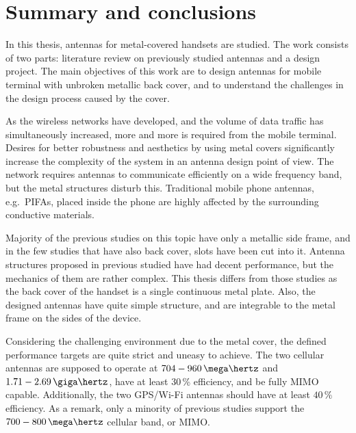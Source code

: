 \section{Summary and conclusions} 
\label{sec:conclusions}

\begin{comment}
\begin{itemize}
\item[--]yhteenveto mitä tehty
\item[--]päätulokset
\item[--]johtopäätökset
\item[--]oma arvio?
\end{itemize}
\end{comment}

In this thesis, antennas for metal-covered handsets are studied. The work consists of two parts: literature review on previously studied antennas and a design project. The main objectives of this work are to design antennas for mobile terminal with unbroken metallic back cover, and to understand the challenges in the design process caused by the cover.

As the wireless networks have developed, and the volume of data traffic has simultaneously increased, more and more is required from the mobile terminal. Desires for better robustness and aesthetics by using metal covers significantly increase the complexity of the system in an antenna design point of view. The network requires antennas to communicate efficiently on a wide frequency band, but the metal structures disturb this. Traditional mobile phone antennas, e.g.\ PIFAs, placed inside the phone are highly affected by the surrounding conductive materials.

Majority of the previous studies on this topic have only a metallic side frame, and in the few studies that have also back cover, slots have been cut into it. Antenna structures proposed in previous studied have had decent performance, but the mechanics of them are rather complex. This thesis differs from those studies as the back cover of the handset is a single continuous metal plate. Also, the designed antennas have quite simple structure, and are integrable to the metal frame on the sides of the device.

Considering the challenging environment due to the metal cover, the defined performance targets are quite strict and uneasy to achieve. The two cellular antennas are supposed to operate at $704-960\,\mega\hertz$ and $1.71-2.69\,\giga\hertz$, have at least 30\,\% efficiency, and be fully MIMO capable. Additionally, the two GPS/Wi-Fi antennas should have at least $40\,\%$ efficiency. As a remark, only a minority of previous studies support the $700-800\,\mega\hertz$ cellular band, or MIMO.




\clearpage